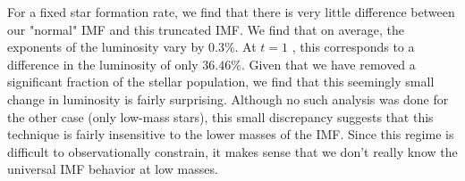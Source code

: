 \documentclass[11pt]{article}
\newenvironment{tight_enumerate}{
    \begin{enumerate}[label=(\alph*)]
    \setlength{\itemsep}{3pt}
    \setlength{\parskip}{0pt}}
    {\end{enumerate}}
\begin{document}
\begin{tight_enumerate}
\item For a fixed star formation rate, we find that there is very little difference between our "normal" IMF and this truncated IMF. We find that on average, the exponents of the luminosity vary by $0.3\%$. At $t = 1$ \si{}, this corresponds to a difference in the luminosity of only $36.46\%$. Given that we have removed a significant fraction of the stellar population, we find that this seemingly small change in luminosity is fairly surprising. Although no such analysis was done for the other case (only low-mass stars), this small discrepancy suggests that this technique is fairly insensitive to the lower masses of the IMF. Since this regime is difficult to observationally constrain, it makes sense that we don't really know the universal IMF behavior at low masses.
\end{tight_enumerate}
\end{document}
